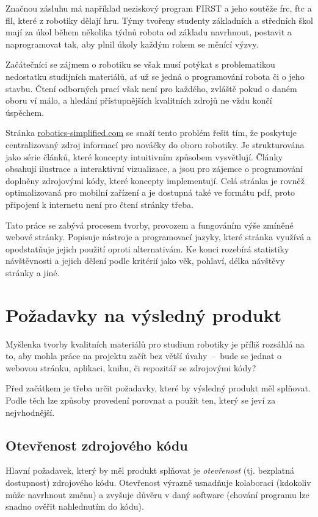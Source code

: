 \documentclass[a4paper, 12pt]{article}
\begin{document}
  Značnou zásluhu má například neziskový program FIRST a jeho soutěže \gls{frc}, \gls{ftc} a \gls{fll}, které z robotiky dělají hru. Týmy tvořeny studenty základních a středních škol mají za úkol během několika týdnů robota od základu navrhnout, postavit a naprogramovat tak, aby plnil úkoly každým rokem se měnící výzvy.

  Začátečníci se zájmem o robotiku se však musí potýkat s problematikou nedostatku studijních materiálů, ať už se jedná o programování robota či o jeho stavbu. Čtení odborných prací však není pro každého, zvláště pokud o daném oboru ví málo, a hledání přístupnějších kvalitních zdrojů ne vždu končí úspěchem.

  Stránka \url{robotics-simplified.com} se snaží tento problém řešit tím, že poskytuje centralizovaný zdroj informací pro nováčky do oboru robotiky. Je strukturována jako série článků, které koncepty intuitivním způsobem vysvětlují. Články obsahují ilustrace a interaktivní vizualizace, a jsou pro zájemce o programování doplněny zdrojovými kódy, které koncepty implementují. Celá stránka je rovněž optimalizovaná pro mobilní zařízení a je dostupná také ve formátu \gls{pdf}, proto připojení k internetu není pro čtení stránky třeba.

  Tato práce se zabývá procesem tvorby, provozem a fungováním výše zmíněné webové stránky. Popisuje nástroje a programovací jazyky, které stránka využívá a opodstatňuje jejich použití oproti alternativám. Ke konci rozebírá statistiky návštěvnosti a jejich dělení podle kritérií jako věk, pohlaví, délka návštěvy stránky a jiné. %

  \newpage

  \section{Požadavky na výsledný produkt} \label{sec:Požadavky na výsledný produkt}
  Myšlenka tvorby kvalitních materiálů pro studium robotiky je příliš rozsáhlá na to, aby mohla práce na projektu začít bez větší úvahy~--~bude se jednat o webovou stránku, aplikaci, knihu, či repozitář se zdrojovými kódy?

  Před začátkem je třeba určit požadavky, které by výsledný produkt měl splňovat. Podle těch lze způsoby provedení porovnat a použít ten, který se jeví za nejvhodnější.


  \subsection{Otevřenost zdrojového kódu}
  Hlavní požadavek, který by měl produkt splňovat je \emph{otevřenost} (tj. bezplatná dostupnost) zdrojového kódu. Otevřenost výrazně usnadňuje kolaboraci (kdokoliv může navrhnout změnu) a zvyšuje důvěru v daný software (chování programu lze snadno ověřit nahlednutím do kódu).
\end{document}
